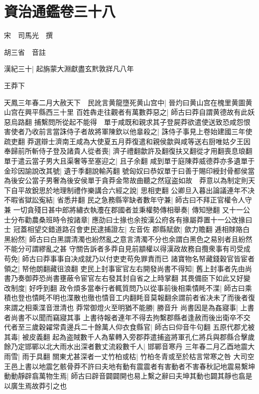 \section{資治通鑑卷三十八}
宋　司馬光　撰

胡三省　音註

漢紀三十|{
	起旃蒙大淵獻盡玄黓敦牂凡八年}


王莽下

天鳳三年春二月大赦天下　民訛言黄龍墮死黄山宫中|{
	晉灼曰黄山宫在槐里黄圖黄山宫在興平縣西三十里}
百姓犇走往觀者有萬數莽惡之|{
	師古曰莽自謂黄德故有此妖惡烏路翻}
捕繫問所從起不能得　單于咸既和親求其子登屍莽欲遣使送致恐咸怨恨害使者乃收前言當誅侍子者故將軍陳欽以他辠殺之|{
	誅侍子事見上卷始建國三年使疏吏翻}
莽選辯士濟南王咸為大使夏五月莽復遣和親侯歙與咸等送右厨唯姑夕王因奉歸前所斬侍子登及諸貴人從者喪|{
	濟子禮翻歙許及翻復扶又翻從才用翻喪息琅翻}
單于遣云當子男大且渠奢等至塞迎之|{
	且子余翻}
咸到單于庭陳莽威德莽亦多遺單于金珍因諭說改其號|{
	遺于季翻說輸芮翻}
號匈奴曰恭奴單于曰善于賜印綬封骨都侯當為後安公當子男奢為後安侯單于貪莽金幣故曲聽之然寇盗如故　莽意以為制定則天下自平故銳思於地理制禮作樂講合六經之說|{
	思相吏翻}
公卿旦入暮出論議連年不决不暇省獄訟寃結|{
	省悉井翻}
民之急務縣宰缺者數年守兼|{
	師古曰不拜正官權令人守兼}
一切貪殘日甚中郎將繡衣執灋在郡國者並秉權勢傳相舉奏|{
	傳知戀翻}
又十一公士分布勸農桑班時令按諸章|{
	應劭曰士掾也余按漢公府各有掾屬莽置十一公改掾曰士}
冠蓋相望交錯道路召會吏民逮捕證左|{
	左音佐}
郡縣賦歛|{
	歛力贍翻}
逓相賕賂白黑紛然|{
	師古曰白黑謂清濁也紛然亂之意言清濁不分也余謂白黑色之易别者且紛然不能分可謂繆亂之甚}
守關告訴者多莽自見前顓權以得漢政故務自攬衆事有司受成苟免|{
	師古曰莽事事自决成就乃以付吏吏苟免罪責而已}
諸寶物名帑藏錢穀官皆宦者領之|{
	帑他朗翻藏徂浪翻}
吏民上封事宦官左右開發尚書不得知|{
	舊上封事者先由尚書乃奏御莽恐尚書壅蔽令宦官左右發其封自省之上時掌翻}
其畏備臣下如此又好變改制度|{
	好呼到翻}
政令煩多當奉行者輒質問乃以從事前後相乘憒眊不渫|{
	師古曰乘積也登也憒眊不明也渫散也徹也憒音工内翻眊音莫報翻余謂前者省决未了而後者復來謂之相乘渫音泄清也}
莽常御燈火至明猶不能勝|{
	勝音升}
尚書因是為姦寢事|{
	上書者尚書不以聞而竊寢其事}
上書待報者連年不得去拘繫郡縣者逢赦而後出衛卒不交代者至三歲穀糴常貴邊兵二十餘萬人仰衣食縣官|{
	師古曰仰音牛句翻}
五原代郡尤被其毒|{
	被皮義翻}
起為盗賊數千人為輩轉入旁郡莽遣捕盗將軍孔仁將兵與郡縣合擊歲餘乃定邯鄲以北大雨水出深者數丈流殺數千人|{
	邯鄲音寒丹}
三年春二月乙酉地震大雨雪|{
	雨于具翻}
關東尤甚深者一丈竹柏或枯|{
	竹柏冬青或至於枯言常寒之咎}
大司空王邑上書以地震乞骸骨莽不許曰夫地有動有震震者有害動者不害春秋記地震易繫坤動動靜辟翕萬物生焉|{
	師古曰辟音闢闢開也易上繫之辭曰夫坤其動也闢其靜也翕是以廣生焉故莽引之也}
